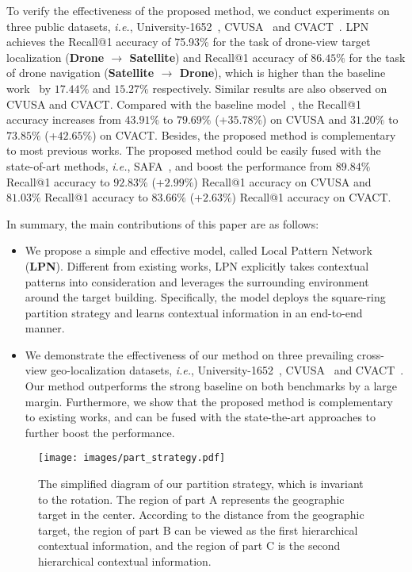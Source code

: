 \documentclass[journal]{IEEEtran}
\def\ie{\emph{i.e.}}
\begin{document}
To verify the effectiveness of the proposed method, we conduct experiments on three public datasets, \ie, University-1652~\cite{zheng_university-1652_nodate}, CVUSA~\cite{zhai_predicting_2017} and CVACT~\cite{liu_lending_2019}. LPN achieves the Recall@1 accuracy of 75.93\% for the task of drone-view target localization (\textbf{Drone $\rightarrow$ Satellite}) and Recall@1 accuracy of $86.45\%$ for the task of drone navigation (\textbf{Satellite $\rightarrow$ Drone}), which is higher than the baseline work~\cite{zheng_university-1652_nodate} by $17.44\%$ and $15.27\%$ respectively. Similar results are also observed on CVUSA and CVACT. Compared with the baseline model~\cite{zheng_university-1652_nodate}, the Recall@1 accuracy increases from $43.91\%$ to $79.69\%$ (+$35.78\%$) on CVUSA and $31.20\%$ to $73.85\%$ (+$42.65\%$) on CVACT.
Besides, the proposed method is complementary to most previous works. The proposed method could be easily fused with the state-of-art methods, \ie, SAFA~\cite{shi_spatial-aware_nodate}, and boost the performance from $89.84\%$ Recall@1 accuracy to $92.83\%$ (+$2.99\%$) Recall@1 accuracy on CVUSA and $81.03\%$ Recall@1 accuracy to $83.66\%$ (+$2.63\%$) Recall@1 accuracy on CVACT.
\par
In summary, the main contributions of this paper are as follows:
\begin{itemize}
\setlength\itemsep{0em}
\item We propose a simple and effective model, called Local Pattern Network (\textbf{LPN}). Different from existing works, LPN explicitly takes contextual patterns into consideration and leverages the surrounding environment around the target building. Specifically, the model deploys the square-ring partition strategy and learns contextual information in an end-to-end manner. 
\item We demonstrate the effectiveness of our method on three prevailing cross-view geo-localization datasets, \ie, University-1652~\cite{zheng_university-1652_nodate}, CVUSA~\cite{zhai_predicting_2017} and CVACT~\cite{liu_lending_2019}. Our method outperforms the strong baseline on both benchmarks by a large margin. Furthermore, we show that the proposed method is complementary to existing works, and can be fused with the state-the-art approaches to further boost the  performance.
\end{itemize}
\begin{figure}[htp]
  \centering
  \texttt{[image: images/part\_strategy.pdf]}
  \caption{The simplified diagram of our partition strategy, which is invariant to the rotation. The region of part A represents the geographic target in the center. According to the distance from the geographic target, the region of part B can be viewed as the first hierarchical contextual information, and the region of part C is the second hierarchical contextual information. 
  }
  \label{fig:part_strategy}
\end{figure}
\end{document}
